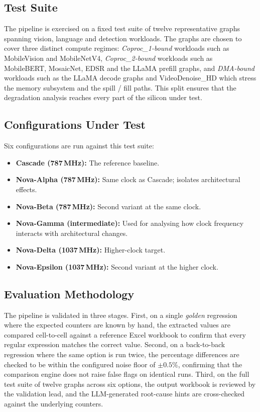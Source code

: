 \documentclass[conference]{IEEEtran}
\begin{document}
\subsection{Test Suite}
The pipeline is exercised on a fixed test suite of twelve representative graphs spanning vision, language and detection workloads. The graphs are chosen to cover three distinct compute regimes: \textit{Coproc\_1-bound} workloads such as MobileVision and MobileNetV4, \textit{Coproc\_2-bound} workloads such as MobileBERT, MosaicNet, EDSR and the LLaMA prefill graphs, and \textit{DMA-bound} workloads such as the LLaMA decode graphs and VideoDenoise\_HD which stress the memory subsystem and the spill / fill paths. This split ensures that the degradation analysis reaches every part of the silicon under test.

\subsection{Configurations Under Test}
Six configurations are run against this test suite:
\begin{itemize}
\item \textbf{Cascade (787\,MHz):} The reference baseline.
\item \textbf{Nova-Alpha (787\,MHz):} Same clock as Cascade; isolates architectural effects.
\item \textbf{Nova-Beta (787\,MHz):} Second variant at the same clock.
\item \textbf{Nova-Gamma (intermediate):} Used for analysing how clock frequency interacts with architectural changes.
\item \textbf{Nova-Delta (1037\,MHz):} Higher-clock target.
\item \textbf{Nova-Epsilon (1037\,MHz):} Second variant at the higher clock.
\end{itemize}

\subsection{Evaluation Methodology}
The pipeline is validated in three stages. First, on a single \textit{golden} regression where the expected counters are known by hand, the extracted values are compared cell-to-cell against a reference Excel workbook to confirm that every regular expression matches the correct value. Second, on a back-to-back regression where the same option is run twice, the percentage differences are checked to be within the configured noise floor of $\pm 0.5\%$, confirming that the comparison engine does not raise false flags on identical runs. Third, on the full test suite of twelve graphs across six options, the output workbook is reviewed by the validation lead, and the LLM-generated root-cause hints are cross-checked against the underlying counters.
\end{document}
